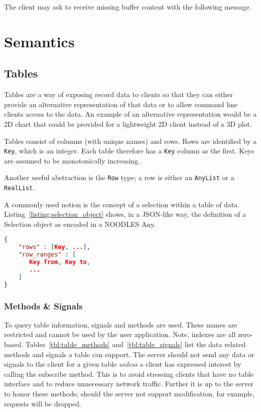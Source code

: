 \documentclass[11pt, oneside]{amsart}
\begin{document}
The client may ask to receive missing buffer content with the following message.




\section{Semantics}


\subsection{Tables}

Tables are a way of exposing record data to clients so that they can either provide an alternative representation of that data or to allow command line clients access to the data. An example of an alternative representation would be a 2D chart that could be provided for a lightweight 2D client instead of a 3D plot.

Tables consist of columns (with unique names) and rows. Rows are identified by a \texttt{Key}, which is an integer. Each table therefore has a \texttt{Key} column as the first. Keys are assumed to be monotonically increasing.

Another useful abstraction is the \texttt{Row} type; a row is either an \texttt{AnyList} or a \texttt{RealList}.

A commonly used notion is the concept of a selection within a table of data. Listing~\ref{listing:selection_object} shows, in a JSON-like way, the definition of a Selection object as encoded in a NOODLES Any.

\begin{lstlisting}[language=json, label=listing:selection_object, caption=Selection object definition. Note that the \texttt{to} field in the row ranges is exclusive. The \texttt{row\_ranges} list \textit{must} have an even number of elements. ]
{
	"rows" : [Key, ...],
	"row_ranges" : [
	   Key from, Key to,
	   ...
	]
}
\end{lstlisting}

\subsubsection{Methods \& Signals}

To query table information, signals and methods are used. These names are restricted and cannot be used by the user application. Note, indexes are all zero-based. Tables~\ref{tbl:table_methods} and~\ref{tbl:table_signals} list the data related methods and signals a table can support. The server should not send any data or signals to the client for a given table \emph{unless} a client has expressed interest by calling the subscribe method. This is to avoid stressing clients that have no table interface and to reduce unnecessary network traffic. Further it is up to the server to honor these methods; should the server not support modification, for example, requests will be dropped.
\end{document}
